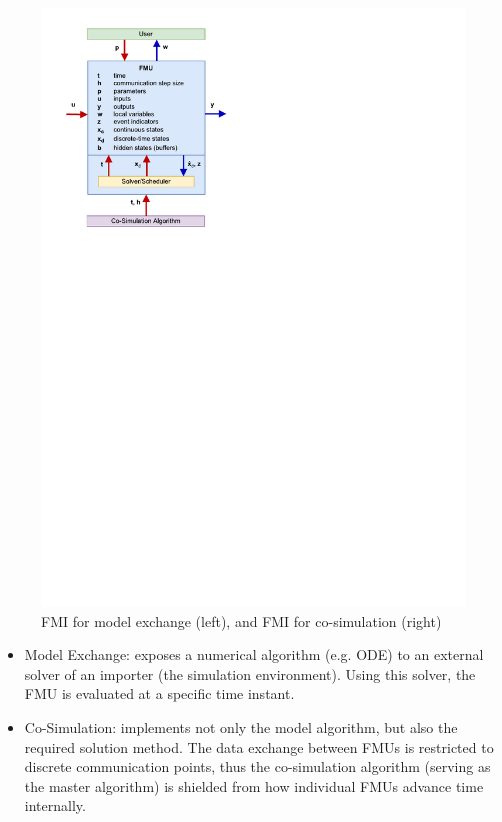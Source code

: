 \documentclass[journal,onecolumn]{IEEEtran} %
\begin{document}
\begin{figure}[hbt!]
   	\includegraphics[scale=0.6]{figures/fmi_cs.pdf}
    \caption{FMI for model exchange (left), and FMI for co-simulation (right) \cite{fmidoc}}
    \label{fig:fmi}
\end{figure}

\begin{itemize}

  \item Model Exchange: exposes a numerical algorithm (e.g. ODE) to an external solver of an importer (the simulation environment). Using this solver, the FMU is evaluated at a specific time instant.
  
  \item Co-Simulation: implements not only the model algorithm, but also the required solution method. The data exchange between FMUs is restricted to discrete communication points, thus the co-simulation algorithm (serving as the master algorithm) is shielded from how individual FMUs advance time internally.
  
\end{itemize}
\end{document}
